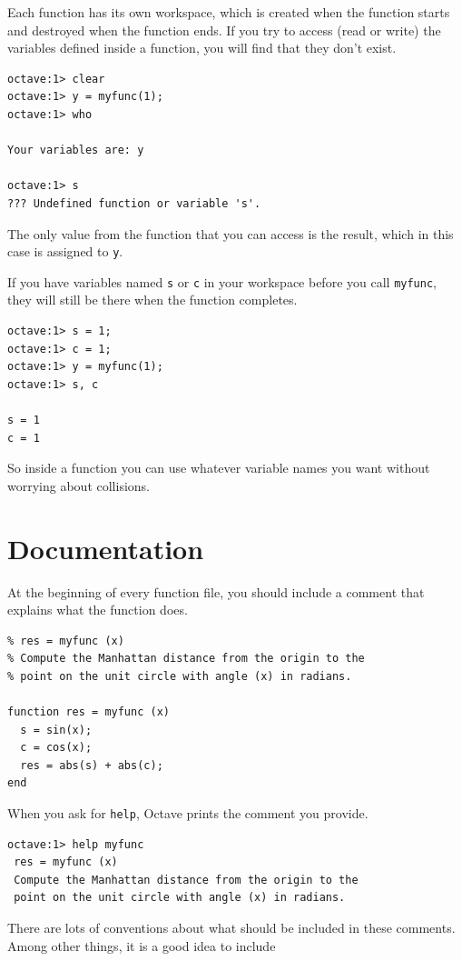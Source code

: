 \documentclass{book}
\begin{document}
Each function has its own workspace, which is created when the
function starts and destroyed when the function ends. If you try to
access (read or write) the variables defined inside a function, you
will find that they don't exist.

\begin{verbatim}
octave:1> clear
octave:1> y = myfunc(1);
octave:1> who

Your variables are: y
 
octave:1> s
??? Undefined function or variable 's'.
\end{verbatim}

The only value from the function that you can access is the result,
which in this case is assigned to {\tt y}.

If you have variables named {\tt s} or {\tt c} in your workspace
before you call {\tt myfunc}, they will still be there when the
function completes.

\begin{verbatim}
octave:1> s = 1;
octave:1> c = 1;
octave:1> y = myfunc(1);
octave:1> s, c

s = 1
c = 1
\end{verbatim}

So inside a function you can use whatever variable names you
want without worrying about collisions.


\section{Documentation}

At the beginning of every function file, you should include a comment
that explains what the function does.

\begin{verbatim}
% res = myfunc (x)
% Compute the Manhattan distance from the origin to the
% point on the unit circle with angle (x) in radians.

function res = myfunc (x)
  s = sin(x);
  c = cos(x);
  res = abs(s) + abs(c);
end
\end{verbatim}

When you ask for {\tt help}, Octave prints the comment you
provide.

\begin{verbatim}
octave:1> help myfunc
 res = myfunc (x)
 Compute the Manhattan distance from the origin to the
 point on the unit circle with angle (x) in radians.
\end{verbatim}

There are lots of conventions about what should be included
in these comments. Among other things, it is a good idea to
include
\end{document}
